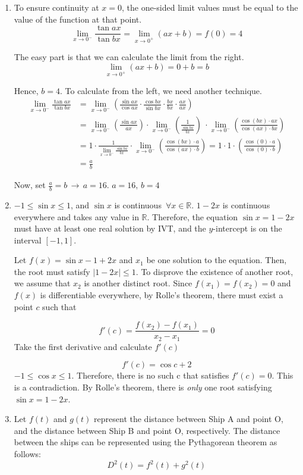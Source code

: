 \documentclass[a4paper, 12pt]{article}
\begin{document}
\begin{enumerate}[leftmargin=*,label=\textbf{\arabic*.}]
\item To ensure continuity at $x=0$, the one-sided limit values must be equal to the value of the function at that point.
\[\lim_{x\to0^-}\frac{\tan ax}{\tan bx}=\lim_{x\to0^+}(ax+b)=f(0)=4\]

The easy part is that we can calculate the limit from the right.
\[\lim_{x\to0^+} (ax+b) = 0+b = b\]

Hence, $b=4$. To calculate from the left, we need another technique.
\begin{align*}
\lim_{x\to0^-} \frac{\tan ax}{\tan bx} &= \lim_{x\to0^-} \left(\frac{\sin ax}{\cos ax} \cdot \frac{\cos bx}{\sin bx} \cdot \frac{bx}{bx}\cdot \frac{ax}{ax}\right)\\[1em]&=\lim_{x\to0^-} \left(\frac{\sin ax}{ax} \right)\cdot \lim_{x\to0^-} \left(\frac1{ \frac{\sin bx}{bx}}\right)\ \cdot \lim_{x\to0^-} \left(\frac{\cos (bx) \cdot ax}{\cos(ax) \cdot bx}\right)\\[1em]&=1\cdot  \frac1{\displaystyle \lim_{x\to0^-}\frac{\sin bx}{bx}}\cdot \lim_{x\to0^-} \left(\frac{\cos (bx) \cdot a}{\cos(ax) \cdot b}\right)= 1\cdot 1\cdot\left(\frac{\cos(0) \cdot a}{\cos(0) \cdot b}\right)\\&=\frac ab
\end{align*}

Now, set $\displaystyle \frac ab = b\,\rightarrow\, a= 16$. $\boxed{a=16,\,b=4}$

\item $-1 \leq \sin x\leq 1$, and $\sin x$ is continuous $\, \forall x\in \mathbb{R}$. $1-2x$ is continuous everywhere and takes any value in $\mathbb{R}$. Therefore, the equation $\sin x=1-2x$ must have at least one real solution by IVT, and the $y$-intercept is on the interval $[-1, 1]$.

Let $f(x) = \sin x - 1 + 2x$ and $x_1$ be one solution to the equation. Then, the root must satisfy $|1-2x| \leq 1$. To disprove the existence of another root, we assume that $x_2$ is another distinct root. Since $f(x_1) = f(x_2) = 0$ and $f(x)$ is differentiable everywhere, by Rolle's theorem, there must exist a point $c$ such that

\[f'(c)=\frac{f(x_2)-f(x_1)}{x_2-x_1}=0\]
Take the first derivative and calculate $f'(c)$

\[f'(c)=\cos c+2\]
$-1\leq\cos x\leq 1$. Therefore, there is no such c that satisfies $f'(c) = 0$. This is a contradiction. By Rolle's theorem, there is \textit{only} one root satisfying $\sin x = 1-2x$.

\item Let $f(t)$ and $g(t)$ represent the distance between Ship A and point O, and the distance between Ship B and point O, respectively. The distance between the ships can be represented using the Pythagorean theorem as follows:
\[D^2(t)=f^2(t)+g^2(t)\]


\end{enumerate}
\end{document}
